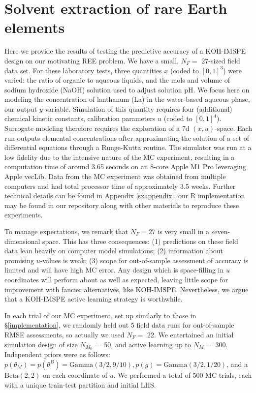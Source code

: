 \documentclass[
]{article}
\begin{document}
\hypertarget{reeapp}{%
\section{Solvent extraction of rare Earth elements}\label{reeapp}}

Here we provide the results of testing the predictive accuracy of a KOH-IMSPE design on our motivating REE problem. We have a small, \(N_F=\) 27-sized field data set. For these laboratory tests, three quantities \(x\) (coded to \([0,1]^3\)) were varied: the ratio of organic to aqueous liquids, and the mols and volume of sodium hydroxide (NaOH) solution used to adjust solution pH. We focus here on modeling the concentration of lanthanum (La) in the water-based aqueous phase, our output \(y\)-variable. Simulation of this quantity requires four (additional) chemical kinetic constants, calibration parameters \(u\) (coded to \([0,1]^4\)). Surrogate modeling therefore requires the exploration of a 7d \((x,u)\)-space. Each run outputs elemental concentrations after approximating the solution of a set of differential equations through a Runge-Kutta routine. The simulator was run at a low fidelity due to the intensive nature of the MC experiment, resulting in a computation time of around 3.65 seconds on an 8-core Apple M1 Pro leveraging Apple vecLib. Data from the MC experiment was obtained from multiple computers and had total processor time of approximately 3.5 weeks. Further technical details can be found in Appendix \ref{sxappendix}; our \textsf{R} implementation may be found in our repository along with other materials to reproduce these experiments.

To manage expectations, we remark that \(N_F = 27\) is very small in a
seven-dimensional space. This has three consequences: (1) predictions on
these field data lean heavily on computer model simulations; (2)
information about promising \(u\)-values is weak; (3) scope for out-of-sample
assessment of accuracy is limited and will have high MC error. Any design
which is space-filling in \(u\) coordinates will perform about as well as
expected, leaving little scope for improvement with fancier alternatives, like
KOH-IMSPE. Nevertheless, we argue that a KOH-IMSPE active learning
strategy is worthwhile.

In each trial of our MC experiment, set up similarly to those in \S \ref{implementation}, we randomly held out 5 field data runs for out-of-sample RMSE assessments, so actually we used \(N_F=\) 22. We entertained an initial simulation design of size \(N_{M_0}=\) 50, and
active learning up to \(N_M=\) 300. Independent priors were as follows: \(p(\theta_M) = p(\theta^B) = \mathrm{Gamma}\left(3/2, 9/10\right), p(g) = \mathrm{Gamma}\left(3/2,1/20\right)\), and a \(\mathrm{Beta}\left(2,2\right)\) on each coordinate of \(u\). We performed a total of 500 MC trials, each with a unique train-test partition and initial LHS.
\end{document}
